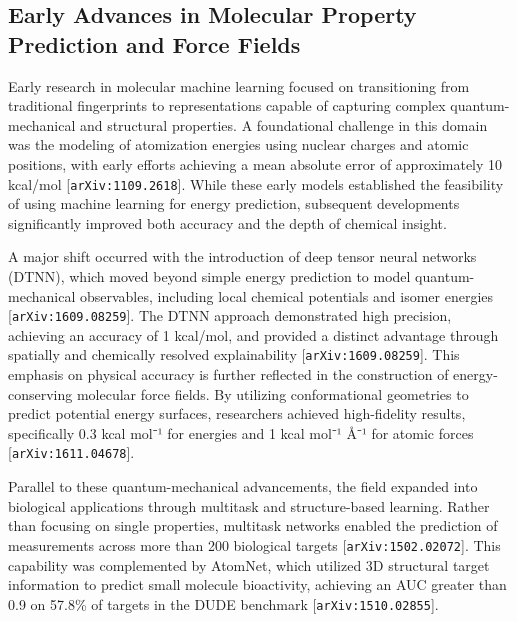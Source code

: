 \documentclass[11pt]{article}
\begin{document}
\subsection{Early Advances in Molecular Property Prediction and Force Fields}

Early research in molecular machine learning focused on transitioning from traditional fingerprints to representations capable of capturing complex quantum-mechanical and structural properties. A foundational challenge in this domain was the modeling of atomization energies using nuclear charges and atomic positions, with early efforts achieving a mean absolute error of approximately 10 kcal/mol [\texttt{arXiv:1109.2618}]. While these early models established the feasibility of using machine learning for energy prediction, subsequent developments significantly improved both accuracy and the depth of chemical insight.

A major shift occurred with the introduction of deep tensor neural networks (DTNN), which moved beyond simple energy prediction to model quantum-mechanical observables, including local chemical potentials and isomer energies [\texttt{arXiv:1609.08259}]. The DTNN approach demonstrated high precision, achieving an accuracy of 1 kcal/mol, and provided a distinct advantage through spatially and chemically resolved explainability [\texttt{arXiv:1609.08259}]. This emphasis on physical accuracy is further reflected in the construction of energy-conserving molecular force fields. By utilizing conformational geometries to predict potential energy surfaces, researchers achieved high-fidelity results, specifically 0.3 kcal mol⁻¹ for energies and 1 kcal mol⁻¹ Å⁻¹ for atomic forces [\texttt{arXiv:1611.04678}].

Parallel to these quantum-mechanical advancements, the field expanded into biological applications through multitask and structure-based learning. Rather than focusing on single properties, multitask networks enabled the prediction of measurements across more than 200 biological targets [\texttt{arXiv:1502.02072}]. This capability was complemented by AtomNet, which utilized 3D structural target information to predict small molecule bioactivity, achieving an AUC greater than 0.9 on 57.8\% of targets in the DUDE benchmark [\texttt{arXiv:1510.02855}].
\end{document}
